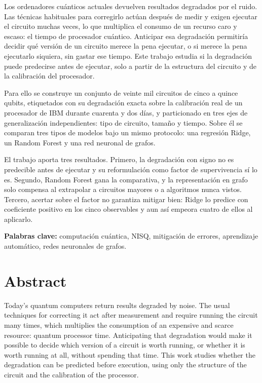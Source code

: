 \documentclass[11pt,a4paper,spanish]{book}
\begin{document}
Los ordenadores cuánticos actuales devuelven resultados degradados por el ruido. Las técnicas
habituales para corregirlo actúan después de medir y exigen ejecutar el circuito muchas veces,
lo que multiplica el consumo de un recurso caro y escaso: el tiempo de procesador cuántico.
Anticipar esa degradación permitiría decidir qué versión de un circuito merece la pena
ejecutar, o si merece la pena ejecutarlo siquiera, sin gastar ese tiempo. Este trabajo estudia
si la degradación puede predecirse antes de ejecutar, solo a partir de la estructura del
circuito y de la calibración del procesador.

Para ello se construye un conjunto de veinte mil circuitos de cinco a quince qubits,
etiquetados con su degradación exacta sobre la calibración real de un procesador de IBM
durante cuarenta y dos días, y particionado en tres ejes de generalización independientes:
tipo de circuito, tamaño y tiempo. Sobre él se comparan tres tipos de modelos bajo un mismo protocolo: 
una regresión Ridge, un Random Forest y una red neuronal de grafos.

El trabajo aporta tres resultados. Primero, la degradación con signo no es predecible antes de
ejecutar y su reformulación como factor
de supervivencia sí lo es. Segundo, Random Forest gana la comparativa, y la representación en
grafo solo compensa al extrapolar a circuitos mayores o a algoritmos nunca vistos. Tercero,
acertar sobre el factor no garantiza mitigar bien: Ridge lo predice con coeficiente positivo
en los cinco observables y aun así empeora cuatro de ellos al aplicarlo.

\textbf{Palabras clave:} computación cuántica, NISQ, mitigación de errores, aprendizaje
automático, redes neuronales de grafos.

\chapter{Abstract}

Today's quantum computers return results degraded by noise. The usual techniques for
correcting it act after measurement and require running the circuit many times, which
multiplies the consumption of an expensive and scarce resource: quantum processor time.
Anticipating that degradation would make it possible to decide which version of a circuit is
worth running, or whether it is worth running at all, without spending that time. This work
studies whether the degradation can be predicted before execution, using only the structure of
the circuit and the calibration of the processor.
\end{document}
